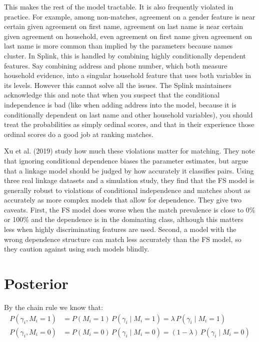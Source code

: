 \documentclass[11pt]{article}
\begin{document}
This makes the rest of the model tractable. It is also frequently violated in practice. For example, among non-matches, agreement on a gender feature is near certain given agreement on first name, agreement on last name is near certain given agreement on household, even agreement on first name given agreement on last name is more common than implied by the parameters because names cluster. In Splink, this is handled by combining highly conditionally dependent features. Say combining address and phone number, which both measure household evidence, into a singular household feature that uses both variables in its levels. However this cannot solve all the issues. The Splink maintainers acknowledge this and note that when you suspect that the conditional independence is bad (like when adding address into the model, because it is conditionally dependent on last name and other household variables), you should treat the probabilities as simply ordinal scores, and that in their experience those ordinal scores do a good job at ranking matches.

Xu et al. (2019) study how much these violations matter for matching. They note that ignoring conditional dependence biases the parameter estimates, but argue that a linkage model should be judged by how accurately it classifies pairs. Using three real linkage datasets and a simulation study, they find that the FS model is generally robust to violations of conditional independence and matches about as accurately as more complex models that allow for dependence. They give two caveats. First, the FS model does worse when the match prevalence is close to 0\% or 100\% and the dependence is in the dominating class, although this matters less when highly discriminating features are used. Second, a model with the wrong dependence structure can match less accurately than the FS model, so they caution against using such models blindly.

\section{Posterior}

By the chain rule we know that:
\[
\begin{aligned}
P(\gamma_i, M_i = 1) &= P(M_i = 1)\, P(\gamma_i \mid M_i = 1) = \lambda\, P(\gamma_i \mid M_i = 1) \\
P(\gamma_i, M_i = 0) &= P(M_i = 0)\, P(\gamma_i \mid M_i = 0) = (1 - \lambda)\, P(\gamma_i \mid M_i = 0)
\end{aligned}
\]
\end{document}
